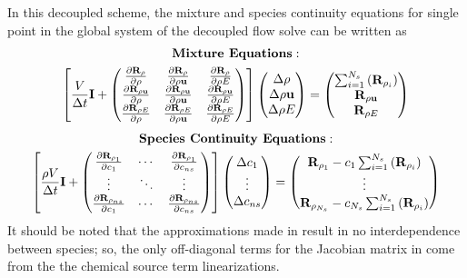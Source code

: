 In this decoupled scheme, the mixture and species continuity equations for
single point in the global system of the decoupled flow solve can be written as
\begin{equation}
  \begin{gathered}
    \text{\bf{Mixture Equations}}: \\
    \left[ 
    \frac{V}{\Delta t}\mathbf I + 
    \begin{pmatrix}
      \frac{\partial \mathbf R_{\rho}}{\partial \rho} & \frac{\partial \mathbf R_{\rho}}{\partial \rho \mathbf u} & \frac{\partial \mathbf R_{\rho}}{\partial \rho E} \\
      \frac{\partial \mathbf R_{\rho \mathbf u}}{\partial \rho} & \frac{\partial \mathbf R_{\rho \mathbf u}}{\partial \rho \mathbf u} & \frac{\partial \mathbf R_{\rho \mathbf u}}{\partial \rho E} \\
      \frac{\partial \mathbf R_{\rho E}}{\partial \rho} & \frac{\partial \mathbf R_{\rho E}}{\partial \rho \mathbf u} & \frac{\partial \mathbf R_{\rho E}}{\partial \rho E}
    \end{pmatrix}
    \right]
  \begin{pmatrix}
    \Delta \rho \\
    \Delta \rho \mathbf u \\
    \Delta \rho E
  \end{pmatrix}
  =
  \begin{pmatrix}
    \sum_{i=1}^{N_s}\left(\mathbf R_{\rho_i}\right) \\
    \mathbf R_{\rho \mathbf u} \\
    \mathbf R_{\rho E}
  \end{pmatrix}
  \end{gathered}
  \label{approx-jac}
\end{equation}
\begin{equation}
  \begin{gathered}
    \text{\bf{Species Continuity Equations}}: \\
    \left[
      \frac{\rho V}{\Delta t}\mathbf I + 
      \begin{pmatrix}
        \frac{\partial \mathbf R_{\rho_1}}{\partial c_1} & \cdots & \frac{\partial \mathbf R_{\rho_{1}}}{\partial c_{ns}} \\
        \vdots & \ddots & \vdots \\
        \frac{\partial \mathbf R_{\rho_{ns}}}{\partial c_1} & \cdots & \frac{\partial \mathbf R_{\rho_{ns}}}{\partial c_{ns}}
      \end{pmatrix}
    \right]
    \begin{pmatrix}
      \Delta c_1 \\
      \vdots \\
      \Delta c_{ns}
    \end{pmatrix}
    =
    \begin{pmatrix}
      \mathbf R_{\rho_1} - c_1 \sum_{i=1}^{N_s}\left(\mathbf R_{\rho_i}\right) \\
      \vdots \\
      \mathbf R_{\rho_{N_s}} - c_{N_s} \sum_{i=1}^{N_s}\left(\mathbf R_{\rho_i}\right)
    \end{pmatrix}
  \end{gathered}
  \label{approx-jac-dc}
\end{equation}
It should be noted that the approximations made in  result
in no interdependence between species; so, the only off-diagonal terms for the
Jacobian matrix in  come from the the chemical source term
linearizations.

